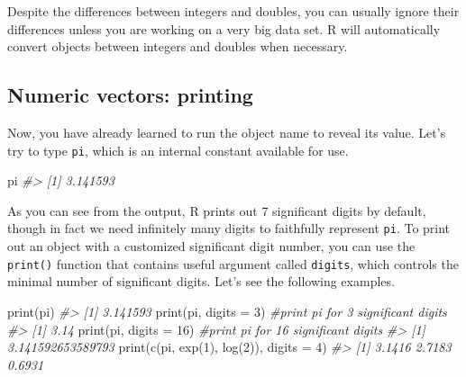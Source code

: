 \documentclass[
]{book}
\newenvironment{Shaded}{\begin{snugshade}}{\end{snugshade}}
\newcommand{\AttributeTok}[1]{\textcolor[rgb]{0.77,0.63,0.00}{#1}}
\newcommand{\CommentTok}[1]{\textcolor[rgb]{0.56,0.35,0.01}{\textit{#1}}}
\newcommand{\DecValTok}[1]{\textcolor[rgb]{0.00,0.00,0.81}{#1}}
\newcommand{\FunctionTok}[1]{\textcolor[rgb]{0.00,0.00,0.00}{#1}}
\newcommand{\NormalTok}[1]{#1}
\newenvironment{blackbox}{
  \definecolor{shadecolor}{rgb}{0, 0, 0}  %
  \color{white}
  \begin{shaded}}
 {\end{shaded}}
\newenvironment{infobox}[1]
  {
  \begin{itemize}
  \renewcommand{\labelitemi}{
    \raisebox{-.7\height}[0pt][0pt]{
      {\setkeys{Gin}{width=3em,keepaspectratio}
        \texttt{[image: pics/\#1]}}
    }
  }
  \setlength{\fboxsep}{1em}
  \begin{blackbox}
  \item
  }
  {
  \end{blackbox}
  \end{itemize}
  }
\begin{document}
\begin{infobox}{caution}
Despite the differences between integers and doubles, you can usually ignore their differences unless you are working on a very big data set. R will automatically convert objects between integers and doubles when necessary.

\end{infobox}

\hypertarget{numeric-vectors-printing-1}{%
\subsection{Numeric vectors: printing}\label{numeric-vectors-printing-1}}

Now, you have already learned to run the object name to reveal its value. Let's try to type \texttt{pi}, which is an internal constant available for use.

\begin{Shaded}
\begin{Highlighting}[]
\NormalTok{pi}
\CommentTok{\#\textgreater{} [1] 3.141593}
\end{Highlighting}
\end{Shaded}

As you can see from the output, R prints out 7 significant digits by default, though in fact we need infinitely many digits to faithfully represent \texttt{pi}. To print out an object with a customized significant digit number, you can use the \texttt{print()} function that contains useful argument called \texttt{digits}, which controls the minimal number of significant digits. Let's see the following examples.

\begin{Shaded}
\begin{Highlighting}[]
\FunctionTok{print}\NormalTok{(pi)}
\CommentTok{\#\textgreater{} [1] 3.141593}
\FunctionTok{print}\NormalTok{(pi, }\AttributeTok{digits =} \DecValTok{3}\NormalTok{)            }\CommentTok{\#print pi for 3 significant digits}
\CommentTok{\#\textgreater{} [1] 3.14}
\FunctionTok{print}\NormalTok{(pi, }\AttributeTok{digits =} \DecValTok{16}\NormalTok{)           }\CommentTok{\#print pi for 16 significant digits}
\CommentTok{\#\textgreater{} [1] 3.141592653589793}
\FunctionTok{print}\NormalTok{(}\FunctionTok{c}\NormalTok{(pi, }\FunctionTok{exp}\NormalTok{(}\DecValTok{1}\NormalTok{), }\FunctionTok{log}\NormalTok{(}\DecValTok{2}\NormalTok{)), }\AttributeTok{digits =} \DecValTok{4}\NormalTok{)}
\CommentTok{\#\textgreater{} [1] 3.1416 2.7183 0.6931}
\end{Highlighting}
\end{Shaded}
\end{document}
